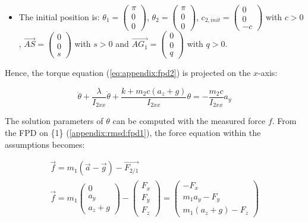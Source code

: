 \documentclass[\main/main.tex]{subfiles}
\begin{document}
\begin{itemize}
 \item The initial position is: $\theta_1 =
       \begin{pmatrix}
        \pi \\
        0 \\
        0
       \end{pmatrix}$, $\theta_2 =
       \begin{pmatrix}
        \pi \\
        0 \\
        0
       \end{pmatrix}$, $c_{2, init} =
       \begin{pmatrix}
        0 \\
        0 \\
        -c
       \end{pmatrix}$ with $c > 0$, $\overrightarrow{AS} =
       \begin{pmatrix}
        0  \\
        0  \\
        s
       \end{pmatrix}$ with $s > 0$ and $\overrightarrow{AG_1} =
       \begin{pmatrix}
        0  \\
        0  \\
        q
       \end{pmatrix}$ with $q > 0$.

\end{itemize}

Hence, the torque equation (\ref{eq:appendix:fpd2}) is projected on the $x$-axis:

\begin{equation*}
 \ddot{\theta} + \frac{\lambda}{I_{2xx}} \dot{\theta} + \frac{k + m_2 c (a_z + g)}{I_{2xx}} \theta = - \frac{m_2 c}{I_{2xx}} a_y
\end{equation*}

The solution parameters of $\theta$ can be computed with the measured force $f$. From the \ac{FPD} on \{1\} (\ref{appendix:rmsd:fpd1}), the force equation within the assumptions becomes:

\begin{gather}
  \label{appendix:rmsd:eq:fpd1}
 \overrightarrow{f} = m_1 (\overrightarrow{a} - \overrightarrow{g}) - \overrightarrow{F_{2/1}} \\
 \overrightarrow{f} = m_1
 \begin{pmatrix}
  0  \\
  a_y  \\
  a_z + g
 \end{pmatrix}
 - \begin{pmatrix}
 F_x \\
 F_y \\
 F_z
 \end{pmatrix}
 = \begin{pmatrix}
 - F_x \\
 m_1 a_y - F_y \\
 m_1 (a_z + g) - F_z
 \end{pmatrix}
\end{gather}
\end{document}
